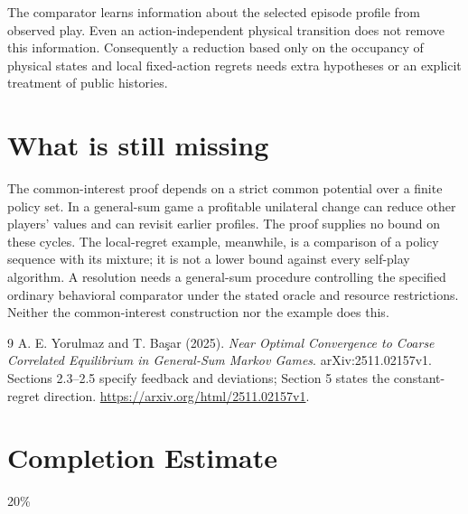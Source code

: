 \documentclass[11pt,a4paper]{article}
\theoremstyle{definition}
\theoremstyle{remark}
\begin{document}
The comparator learns information about the selected episode profile from observed play. Even an action-independent physical transition does not remove this information. Consequently a reduction based only on the occupancy of physical states and local fixed-action regrets needs extra hypotheses or an explicit treatment of public histories.

\section{What is still missing}
The common-interest proof depends on a strict common potential over a finite policy set. In a general-sum game a profitable unilateral change can reduce other players' values and can revisit earlier profiles. The proof supplies no bound on these cycles. The local-regret example, meanwhile, is a comparison of a policy sequence with its mixture; it is not a lower bound against every self-play algorithm. A resolution needs a general-sum procedure controlling the specified ordinary behavioral comparator under the stated oracle and resource restrictions. Neither the common-interest construction nor the example does this.

\begin{thebibliography}{9}
 A. E. Yorulmaz and T. Ba\c{s}ar (2025).
\emph{Near Optimal Convergence to Coarse Correlated Equilibrium in General-Sum Markov Games}. arXiv:2511.02157v1. Sections 2.3--2.5 specify feedback and deviations; Section 5 states the constant-regret direction.
\url{https://arxiv.org/html/2511.02157v1}.
\end{thebibliography}

\section{Completion Estimate}
20\%
\end{document}
